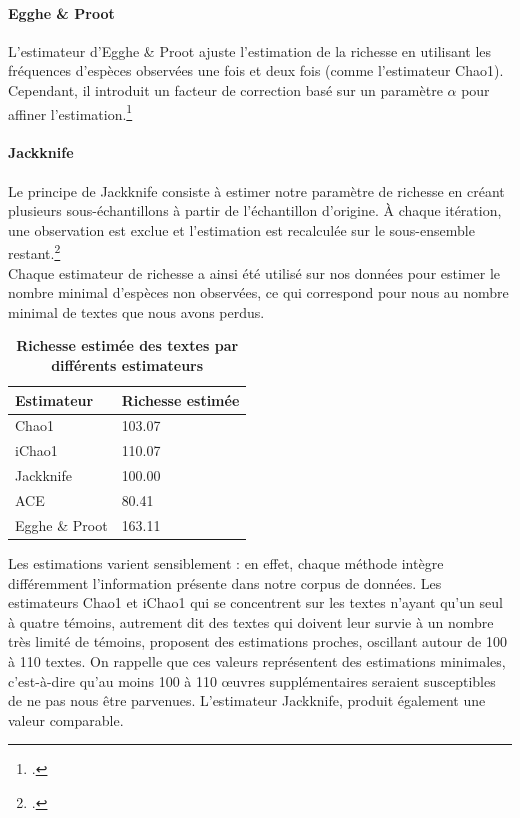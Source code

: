 \documentclass[a4paper,twoside,12pt]{book}
\begin{document}
\paragraph{Egghe \& Proot} L'estimateur d'Egghe \& Proot ajuste l'estimation de la richesse en utilisant les fréquences d'espèces observées une fois et deux fois (comme l'estimateur Chao1). Cependant, il introduit un facteur de correction  basé sur un paramètre  $\alpha$ pour affiner l'estimation.\footcite{egghe2007lost}

\paragraph{Jackknife}Le principe de Jackknife consiste à estimer notre paramètre de richesse en créant plusieurs sous-échantillons à partir de l'échantillon d'origine. À chaque itération, une observation est exclue et l’estimation est recalculée sur le sous-ensemble restant.\footcite{burnham1978closed}\\


Chaque estimateur de richesse a ainsi été utilisé sur nos données pour estimer le nombre minimal d'espèces non observées, ce qui correspond pour nous au nombre minimal de textes que nous avons perdus. 

\begin{table}[h!]
	\centering
	\begin{tabular}{|l|l|}
		\hline
		\textbf{Estimateur} & \textbf{Richesse estimée} \\
		\hline
		Chao1 & 103.07 \\
		\hline
		iChao1 & 110.07 \\
		\hline
		Jackknife & 100.00 \\
		\hline
		ACE & 80.41 \\
		\hline
		Egghe \& Proot & 163.11 \\
		\hline
	\end{tabular}
	\caption\textbf{{Richesse estimée des textes par différents estimateurs}}
	\label{tab:resultats_estimateurs}
	\end{table}
	
Les estimations varient sensiblement : en effet, chaque méthode intègre différemment l'information présente dans notre corpus de données. Les estimateurs Chao1 et iChao1 qui se concentrent sur les textes n'ayant qu'un seul à quatre témoins, autrement dit des textes qui doivent leur survie à un nombre très limité de témoins, proposent des estimations proches, oscillant autour de 100 à 110 textes. On rappelle que ces valeurs représentent des estimations minimales, c’est-à-dire qu’au moins 100 à 110 œuvres supplémentaires seraient susceptibles de ne pas nous être parvenues. L’estimateur Jackknife, produit également une valeur comparable. 
\end{document}

